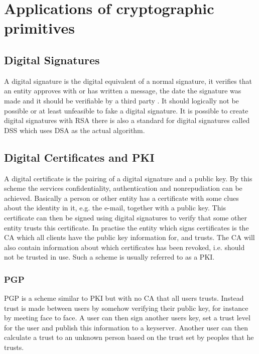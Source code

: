 \documentclass[english,12pt,a4paper]{book}
\begin{document}
\section{Applications of cryptographic primitives}

\subsection{Digital Signatures}
A digital signature is the digital equivalent of a normal signature, it
verifies that an entity approves with or has written a message, the date the
signature was made and it should be verifiable by a third party \cite[p.
379]{schneier}. It should logically not be possible or at least unfeasible to
fake a digital signature. It is possible to create digital signatures with
\ac{RSA} there is also a standard for digital signatures called \ac{DSS} which
uses \ac{DSA} as the actual algorithm.

\subsection{Digital Certificates and PKI}
A digital certificate is the pairing of a digital signature and a public key.
By this scheme the services confidentiality, authentication and nonrepudiation
can be achieved.  Basically a person or other entity has a certificate with
some clues about the identity in it, e.g. the e-mail, together with a public
key. This certificate can then be signed using digital signatures to verify
that some other entity trusts this certificate. In practise the entity which
signs certificates is the \ac{CA} which all clients have the public key
information for, and trusts. The \ac{CA} will also contain information about
which certificates has been revoked, i.e. should not be trusted in use. Such a
scheme is usually referred
to as a \ac{PKI}.

\subsubsection{PGP}
\ac{PGP} is a scheme similar to \ac{PKI} but with no \ac{CA} that all users
trusts. Instead trust is made between users by somehow verifying their public
key, for instance by meeting face to face. A user can then sign another users
key, set a trust level for the user and publish this information to a
keyserver. Another user can then calculate a trust to an unknown person based
on the trust set by peoples that he trusts. 
\end{document}

